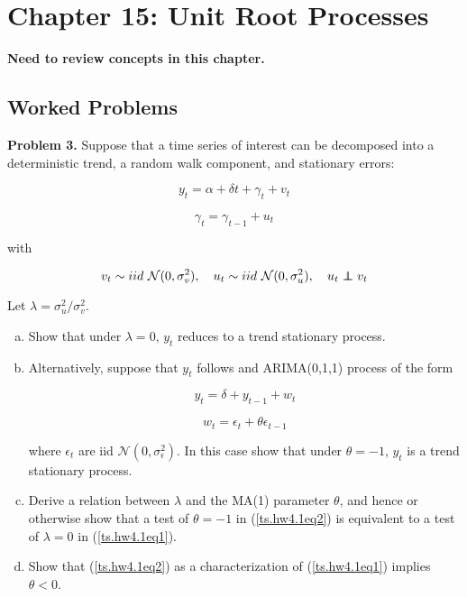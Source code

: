 %
%
%
%
%
%

\section{Chapter 15: Unit Root Processes}

\textbf{Need to review concepts in this chapter.}

\subsection{Worked Problems}

\textbf{Problem 3.} Suppose that a time series of interest can be decomposed into a deterministic trend, a random walk component, and stationary errors:

\begin{equation} \label{ts.hw4.1eq1}
y_t = \alpha + \delta t + \gamma_t + v_t
\end{equation}

\[
\gamma_t = \gamma_{t-1} + u_t
\]

with

\[
v_t \sim iid \ \mathcal{N}(0, \sigma_v^2), \ \ \ u_t \sim iid \ \mathcal{N}(0, \sigma_u^2), \ \ \ u_t \indep v_t
\]

Let \(\lambda = \sigma_u^2/\sigma_v^2\).

\begin{enumerate}[(a)]

\item Show that under \(\lambda =0\), \(y_t\) reduces to a trend stationary process.

\item Alternatively, suppose that \(y_t\) follows and ARIMA(0,1,1) process of the form

\begin{equation} \label{ts.hw4.1eq2}
y_t = \delta + y_{t-1} + w_t
\end{equation}

\[
w_t = \epsilon_t + \theta \epsilon_{t-1}
\]

where \(\epsilon_t\) are iid \(\mathcal{N}(0, \sigma_\epsilon^2)\). In this case show that under \(\theta = -1\), \(y_t\) is a trend stationary process.

\item Derive a relation between \(\lambda\) and the MA(1) parameter \(\theta\), and hence or otherwise show that a test of \(\theta = -1\) in (\ref{ts.hw4.1eq2}) is equivalent to a test of \(\lambda =0\) in (\ref{ts.hw4.1eq1}).

\item Show that (\ref{ts.hw4.1eq2}) as a characterization of (\ref{ts.hw4.1eq1}) implies \(\theta < 0\).

\end{enumerate}



